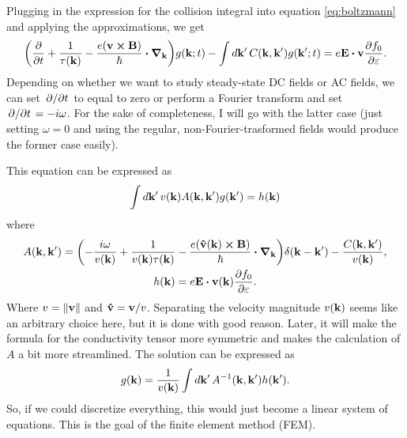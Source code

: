 \documentclass[12pt]{article}
\begin{document}
Plugging in the expression for the collision integral into equation \eqref{eq:boltzmann} and
applying the approximations, we get
\begin{equation}
    \qty(\pdv{t} + \frac{1}{\tau(\vb{k})} - \frac{e(\vb{v}\cross\vb{B})}{\hbar}\vdot\grad_{\vb{k}})
    g(\vb{k}; t) - \int\dd{\vb{k'}} C(\vb{k}, \vb{k'}) g(\vb{k'}; t)
    = e\vb{E}\vdot\vb{v}\pdv{f_0}{\varepsilon}.
\end{equation}
Depending on whether we want to study steady-state DC fields or AC fields, we can set $\pdv*{t}$ to
equal to zero or perform a Fourier transform and set $\pdv*{t} = -i\omega$. For the sake of
completeness, I will go with the latter case (just setting $\omega=0$ and using the regular,
non-Fourier-trasformed fields would produce the former case easily).

This equation can be expressed as
\begin{equation}
    \int \dd{\vb{k'}} v(\vb{k}) A(\vb{k}, \vb{k'}) g(\vb{k'}) = h(\vb{k})
    \label{eq:integral_equation}
\end{equation}
where
\begin{gather}
    A(\vb{k}, \vb{k'}) = \qty(-\frac{i\omega}{v(\vb{k})} + \frac{1}{v(\vb{k})\tau(\vb{k})}
        - \frac{e\qty(\vu{v}(\vb{k})\cross\vb{B})}{\hbar}\vdot\grad_{\vb{k}})\delta(\vb{k}-\vb{k'})
        - \frac{C(\vb{k},\vb{k'})}{v(\vb{k})}, \label{eq:operator} \\
    h(\vb{k}) = e\vb{E}\vdot\vb{v}(\vb{k})\pdv{f_0}{\varepsilon}.
\end{gather}
Where $v=\norm{\vb{v}}$ and $\vu{v}=\vb{v}/v$. Separating the velocity magnitude $v(\vb{k})$
seems like an arbitrary choice here, but it is done with good reason. Later, it will make the
formula for the conductivity tensor more symmetric and makes the calculation of $A$ a bit more
streamlined. The solution can be expressed as
\begin{equation}
    g(\vb{k}) = \frac{1}{v(\vb{k})} \int\dd{\vb{k'}} A^{-1}(\vb{k}, \vb{k'}) h(\vb{k'}).
\end{equation}
So, if we could discretize everything, this would just become a linear system of equations. This is
the goal of the finite element method (FEM).
\end{document}
